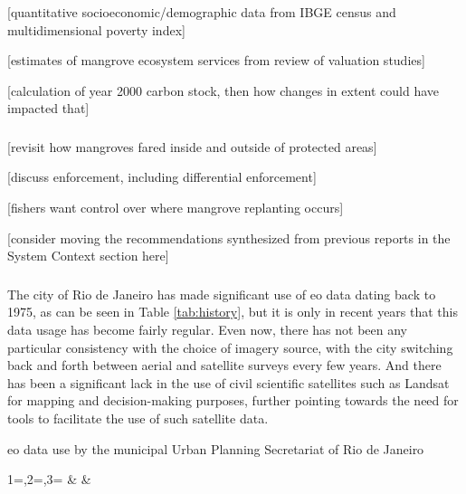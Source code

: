 [quantitative socioeconomic/demographic data from IBGE census and multidimensional poverty index]

[estimates of mangrove ecosystem services from review of valuation studies]

[calculation of year 2000 carbon stock, then how changes in extent could have impacted that]

\subsubsection{} 

[revisit how mangroves fared inside and outside of protected areas]

[discuss enforcement, including differential enforcement]

[fishers want control over where mangrove replanting occurs]

[consider moving the recommendations synthesized from previous reports in the System Context section here]

\subsubsection{} 

The city of Rio de Janeiro has made significant use of \ac{eo} data dating back to 1975, as can be seen in Table \ref{tab:history}, but it is only in recent years that this data usage has become fairly regular. Even now, there has not been any particular consistency with the choice of imagery source, with the city switching back and forth between aerial and satellite surveys every few years. And there has been a significant lack in the use of civil scientific satellites such as Landsat for mapping and decision-making purposes, further pointing towards the need for tools to facilitate the use of such satellite data.

\begin{table}[H]\centering
	\caption[EO data use by Rio de Janeiro]{\ac{eo} data use by the  municipal Urban Planning Secretariat of Rio de Janeiro}\label{tab:history}
	\fontsize{8}{10}\selectfont
		{1=\year,2=\type,3=\platform}
		{\year & \type & \platform}
\end{table}

